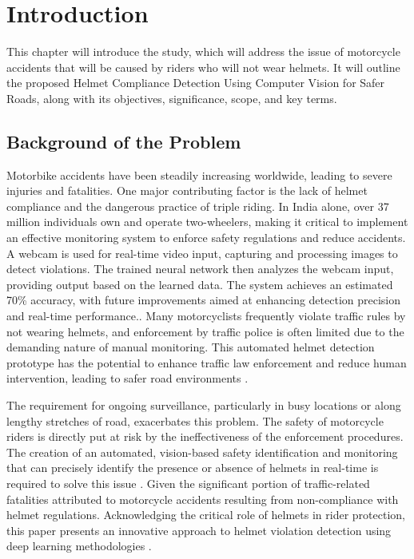 
\chapter{Introduction}
This chapter will introduce the study, which will address the issue of motorcycle accidents that will be caused by riders who will not wear helmets. It will outline the proposed Helmet Compliance Detection Using Computer Vision for Safer Roads, along with its objectives, significance, scope, and key terms.
\begin{refsection}
\section{Background of the Problem}
Motorbike accidents have been steadily increasing worldwide, leading to severe injuries and fatalities. One major contributing factor is the lack of helmet compliance and the dangerous practice of triple riding. In India alone, over 37 million individuals own and operate two-wheelers, making it critical to implement an effective monitoring system to enforce safety regulations and reduce accidents. A webcam is used for real-time video input, capturing and processing images to detect violations. The trained neural network then analyzes the webcam input, providing output based on the learned data. The system achieves an estimated 70\% accuracy, with future improvements aimed at enhancing detection precision and real-time performance.\cite{Maddi2023}. Many motorcyclists frequently violate traffic rules by not wearing helmets, and enforcement by traffic police is often limited due to the demanding nature of manual monitoring. This automated helmet detection prototype has the potential to enhance traffic law enforcement and reduce human intervention, leading to safer road environments \cite{Godbole2024}.


The requirement for ongoing surveillance, particularly in busy locations or along lengthy stretches of road, exacerbates this problem. The safety of motorcycle riders is directly put at risk by the ineffectiveness of the enforcement procedures. The creation of an automated, vision-based safety identification and monitoring that can precisely identify the presence or absence of helmets in real-time is required to solve this issue \cite {Kumar2023}. Given the significant portion of traffic-related fatalities attributed to motorcycle accidents resulting from non-compliance with helmet regulations. Acknowledging the critical role of helmets in rider protection, this paper presents an innovative approach to helmet violation detection using deep learning methodologies \cite{Said2024}.



\end{refsection}

